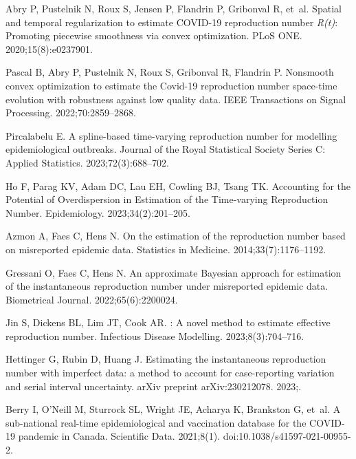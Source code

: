 \documentclass[10pt,letterpaper]{article}
\begin{document}
\begin{thebibliography}{10}
  Abry P, Pustelnik N, Roux S, Jensen P, Flandrin P, Gribonval R, et~al.
  \newblock Spatial and temporal regularization to estimate {COVID-19}
    reproduction number \emph{R(t)}: Promoting piecewise smoothness via convex
    optimization.
  \newblock PLoS ONE. 2020;15(8):e0237901.
  
  Pascal B, Abry P, Pustelnik N, Roux S, Gribonval R, Flandrin P.
  \newblock Nonsmooth convex optimization to estimate the {C}ovid-19 reproduction
    number space-time evolution with robustness against low quality data.
  \newblock IEEE Transactions on Signal Processing. 2022;70:2859--2868.
  
  Pircalabelu E.
  \newblock A spline-based time-varying reproduction number for modelling
    epidemiological outbreaks.
  \newblock Journal of the Royal Statistical Society Series C: Applied
    Statistics. 2023;72(3):688--702.
  
  Ho F, Parag KV, Adam DC, Lau EH, Cowling BJ, Tsang TK.
  \newblock Accounting for the Potential of Overdispersion in Estimation of the
    Time-varying Reproduction Number.
  \newblock Epidemiology. 2023;34(2):201--205.
  
  Azmon A, Faes C, Hens N.
  \newblock On the estimation of the reproduction number based on misreported
    epidemic data.
  \newblock Statistics in Medicine. 2014;33(7):1176--1192.
  
  Gressani O, Faes C, Hens N.
  \newblock An approximate {B}ayesian approach for estimation of the
    instantaneous reproduction number under misreported epidemic data.
  \newblock Biometrical Journal. 2022;65(6):2200024.
  
  Jin S, Dickens BL, Lim JT, Cook AR.
  : A novel method to estimate effective reproduction number.
  \newblock Infectious Disease Modelling. 2023;8(3):704--716.
  
  Hettinger G, Rubin D, Huang J.
  \newblock Estimating the instantaneous reproduction number with imperfect data:
    a method to account for case-reporting variation and serial interval
    uncertainty.
  \newblock arXiv preprint arXiv:230212078. 2023;.
  
  Berry I, O'Neill M, Sturrock SL, Wright JE, Acharya K, Brankston G, et~al.
  \newblock A sub-national real-time epidemiological and vaccination database for
    the {COVID}-19 pandemic in Canada.
  \newblock Scientific Data. 2021;8(1).
  \newblock doi:{10.1038/s41597-021-00955-2}.
  

\end{thebibliography}
\end{document}
